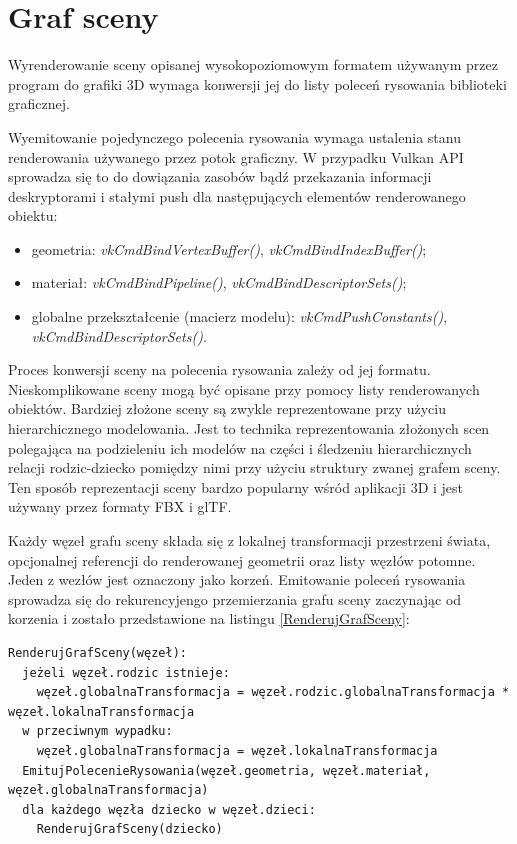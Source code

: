 \section{Graf sceny}

Wyrenderowanie sceny opisanej wysokopoziomowym formatem używanym przez program do grafiki 3D wymaga konwersji jej do listy poleceń rysowania biblioteki graficznej.

Wyemitowanie pojedynczego polecenia rysowania wymaga ustalenia stanu renderowania używanego przez potok graficzny. W przypadku Vulkan API sprowadza się to do dowiązania zasobów bądź przekazania informacji deskryptorami i stałymi push dla następujących elementów renderowanego obiektu:
\begin{itemize}
	\item geometria: \textit{vkCmdBindVertexBuffer()}, \textit{vkCmdBindIndexBuffer()};
	\item materiał: \textit{vkCmdBindPipeline()}, \textit{vkCmdBindDescriptorSets()};
	\item globalne przekształcenie (macierz modelu): \textit{vkCmdPushConstants()}, \textit{vkCmdBindDescriptorSets()}.
\end{itemize}

Proces konwersji sceny na polecenia rysowania zależy od jej formatu.
Nieskomplikowane sceny mogą być opisane przy pomocy listy renderowanych obiektów. Bardziej złożone sceny są zwykle reprezentowane przy użyciu hierarchicznego modelowania.
Jest to technika reprezentowania złożonych scen polegająca na podzieleniu ich modelów na części i śledzeniu hierarchicznych relacji rodzic-dziecko pomiędzy nimi przy użyciu struktury zwanej grafem sceny. Ten sposób reprezentacji sceny bardzo popularny wśród aplikacji 3D i jest używany przez formaty FBX i glTF.

Każdy węzeł grafu sceny składa się z lokalnej transformacji przestrzeni świata, opcjonalnej referencji do renderowanej geometrii oraz listy węzłów potomne. Jeden z wezłów jest oznaczony jako korzeń.
Emitowanie poleceń rysowania sprowadza się do rekurencyjengo przemierzania grafu sceny zaczynając od korzenia \cite{kosarevsky20213d} i zostało przedstawione na listingu \ref{RenderujGrafSceny}:
\lstset{language=verbatim}
\begin{lstlisting}[caption={Emitowanie poleceń rysowania na podstawie grafu sceny},captionpos=b,label={RenderujGrafSceny}]
RenderujGrafSceny(węzeł):
  jeżeli węzeł.rodzic istnieje:
    węzeł.globalnaTransformacja = węzeł.rodzic.globalnaTransformacja * węzeł.lokalnaTransformacja
  w przeciwnym wypadku:
    węzeł.globalnaTransformacja = węzeł.lokalnaTransformacja
  EmitujPolecenieRysowania(węzeł.geometria, węzeł.materiał, węzeł.globalnaTransformacja)
  dla każdego węzła dziecko w węzeł.dzieci:
    RenderujGrafSceny(dziecko)
\end{lstlisting}

